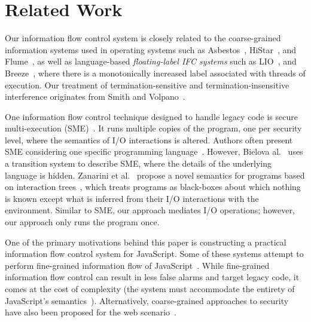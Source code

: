 \section{Related Work}
\label{sec:related}




Our information flow control system is closely related
to the coarse-grained information systems used in operating systems such
as Asbestos~\cite{efstathopoulos:asbestos},
HiStar~\cite{Zeldovich:2006}, and Flume~\cite{krohn:flume}, as well as language-based
\emph{floating-label IFC systems} such as LIO~\cite{lio},
and Breeze~\cite{Hritcu:2013:YIB:2497621.2498098}, where there is a
monotonically increased label
associated with threads of execution.
Our treatment of termination-sensitive and termination-insensitive interference
originates from Smith and Volpano~\cite{Smith:Volpano:MultiThreaded,Volpano:1997:ECF:794197.795081}.

One information flow control technique designed to handle legacy code is
secure multi-execution (SME)~\cite{Devriese:2010}. It runs
multiple copies of the program, one per security level, where the semantics of
I/O interactions is altered. Authors often present
SME considering one specific programming
language~\cite{KULeuven-350547,Rafnson:2013}. However, Bielova
al.~\cite{Biel-etal-11-TR} uses a transition system to describe SME, where the
details of the underlying language is hidden.  Zanarini et
al.~\cite{ZanariniJR13} propose a novel semantics for programs based on
interaction trees~\cite{jacobs-tutorial}, which treats programs as black-boxes
about which nothing is known except what is inferred from their I/O interactions
with the environment. Similar to SME, our approach mediates I/O
operations; however, our approach only runs the program once.


One of the primary motivations behind this paper is constructing a practical
information flow control system for JavaScript.  Some of these systems attempt
to perform fine-grained information flow of
JavaScript~\cite{Hedin:2012,ConDOM,JSFlow}. While fine-grained information flow
control can result in less false alarms and target legacy code, it comes at the
cost of complexity (the system must accommodate the entirety of JavaScript's
semantics~\cite{JSFlow}).
Alternatively, coarse-grained
approaches to security have also been proposed for the web
scenario~\cite{Yip:2009:PBS,DeGroef:2012,conf/esorics/AkhaweLHSS13}.


